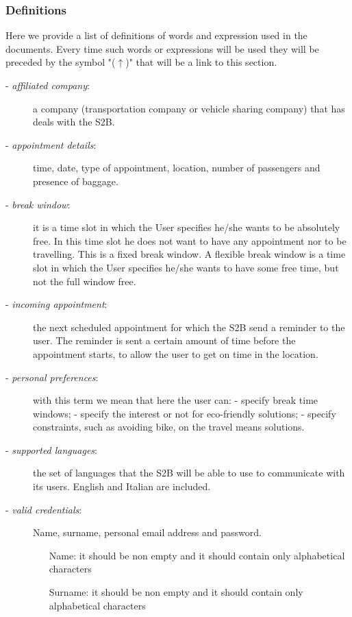 	\subsubsection{Definitions}
		\label{definitions}
		Here we provide a list of definitions of words and expression used in the documents. Every time such words or expressions will be used they will be preceded by the symbol "($\uparrow$)" that will be a link to this section.
		\begin{description}
			\item[- \textit{affiliated company}:] a company (transportation company or vehicle sharing company) that has deals with the S2B.
			\item[- \textit{appointment details}:] time, date, type of appointment, location, number of passengers and presence of baggage.
			\item[- \textit{break window}:] it is a time slot in which the User specifies he/she wants to be absolutely free. In this time slot he does not want to have any appointment nor to be travelling. This is a fixed break window. A flexible break window is a time slot in which the User specifies he/she wants to have some free time, but not the full window free.
			\item[- \textit{incoming appointment}:] the next scheduled appointment for which the S2B send a reminder to the user. The reminder is sent  a certain amount of time before the appointment starts, to allow the user to get on time in the location.
			\item[- \textit{personal preferences}:] with this term we mean that here the user can:\newline
			- specify break time windows; \newline
			- specify the interest or not for eco-friendly solutions;\newline
			- specify constraints, such as avoiding  bike, on the travel means solutions.
			\item[- \textit{supported languages}:] the set of languages that the S2B will be able to use to communicate with its users. English and Italian are included.
			\item[- \textit{valid credentials}:] Name, surname, personal email address and password.
			\begin{itemize}
				\item[Name:] it should be non empty and it should contain only alphabetical characters
				\item[Surname:] it should be non empty and it should contain only alphabetical characters

\end{itemize}
\end{description}

